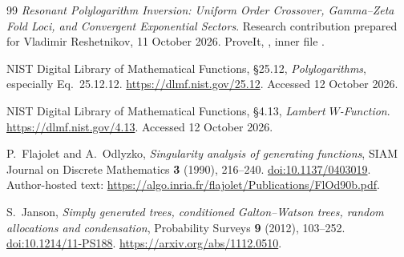 \begin{thebibliography}{99}
\emph{Resonant Polylogarithm Inversion: Uniform Order Crossover,
Gamma--Zeta Fold Loci, and Convergent Exponential Sectors}.
Research contribution prepared for Vladimir Reshetnikov,
11 October 2026.
ProveIt, ,
inner file .

NIST Digital Library of Mathematical Functions, \S25.12,
\emph{Polylogarithms}, especially Eq.~25.12.12.
\url{https://dlmf.nist.gov/25.12}.
Accessed 12 October 2026.

NIST Digital Library of Mathematical Functions, \S4.13,
\emph{Lambert $W$-Function}.
\url{https://dlmf.nist.gov/4.13}.
Accessed 12 October 2026.

P.~Flajolet and A.~Odlyzko,
\emph{Singularity analysis of generating functions},
SIAM Journal on Discrete Mathematics \textbf{3} (1990), 216--240.
\href{https://doi.org/10.1137/0403019}{doi:10.1137/0403019}.
Author-hosted text:
\url{https://algo.inria.fr/flajolet/Publications/FlOd90b.pdf}.

S.~Janson,
\emph{Simply generated trees, conditioned Galton--Watson trees,
random allocations and condensation},
Probability Surveys \textbf{9} (2012), 103--252.
\href{https://doi.org/10.1214/11-PS188}{doi:10.1214/11-PS188}.
\url{https://arxiv.org/abs/1112.0510}.

\end{thebibliography}
